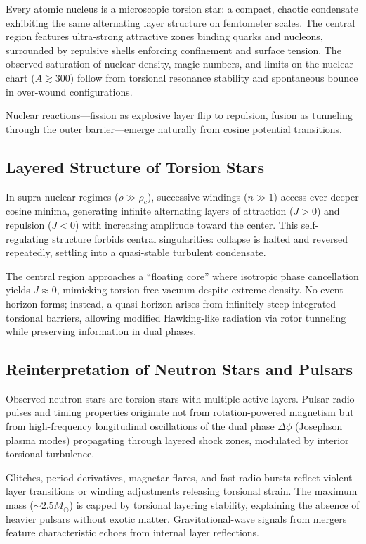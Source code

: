 \documentclass[a4paper]{article}
\begin{document}
Every atomic nucleus is a microscopic torsion star: a compact, chaotic condensate exhibiting the same alternating layer structure on femtometer scales. The central region features ultra-strong attractive zones binding quarks and nucleons, surrounded by repulsive shells enforcing confinement and surface tension. The observed saturation of nuclear density, magic numbers, and limits on the nuclear chart ($A \gtrsim 300$) follow from torsional resonance stability and spontaneous bounce in over-wound configurations.

Nuclear reactions—fission as explosive layer flip to repulsion, fusion as tunneling through the outer barrier—emerge naturally from cosine potential transitions.

\subsection{Layered Structure of Torsion Stars}

In supra-nuclear regimes ($\rho \gg \rho_c$), successive windings ($n \gg 1$) access ever-deeper cosine minima, generating infinite alternating layers of attraction ($J > 0$) and repulsion ($J < 0$) with increasing amplitude toward the center. This self-regulating structure forbids central singularities: collapse is halted and reversed repeatedly, settling into a quasi-stable turbulent condensate.

The central region approaches a ``floating core'' where isotropic phase cancellation yields $J \approx 0$, mimicking torsion-free vacuum despite extreme density. No event horizon forms; instead, a quasi-horizon arises from infinitely steep integrated torsional barriers, allowing modified Hawking-like radiation via rotor tunneling while preserving information in dual phases.

\subsection{Reinterpretation of Neutron Stars and Pulsars}

Observed neutron stars are torsion stars with multiple active layers. Pulsar radio pulses and timing properties originate not from rotation-powered magnetism but from high-frequency longitudinal oscillations of the dual phase $\Delta\phi$ (Josephson plasma modes) propagating through layered shock zones, modulated by interior torsional turbulence.

Glitches, period derivatives, magnetar flares, and fast radio bursts reflect violent layer transitions or winding adjustments releasing torsional strain. The maximum mass ($\sim 2.5 M_\odot$) is capped by torsional layering stability, explaining the absence of heavier pulsars without exotic matter. Gravitational-wave signals from mergers feature characteristic echoes from internal layer reflections.
\end{document}
